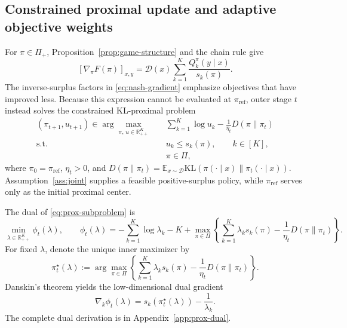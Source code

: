 \documentclass{article}
\theoremstyle{remark}
\theoremstyle{plain}
\newcommand{\KL}{\mathrm{KL}}
\newcommand{\E}{\mathbb{E}}
\newcommand{\R}{\mathbb{R}}
\newcommand{\D}{\mathcal{D}}
\newcommand{\piref}{\pi_{\mathrm{ref}}}
\begin{document}
\subsection{Constrained proximal update and adaptive objective weights}
For $\pi\in\Pi_+$, Proposition~\ref{prop:game-structure} and the chain rule give
\begin{equation}
\left[\nabla_\pi F(\pi)\right]_{x,y}
=
\D(x)\sum_{k=1}^K
\frac{Q_k^\pi(y\mid x)}{s_k(\pi)}.
\label{eq:nash-gradient}
\end{equation}
The inverse-surplus factors in \eqref{eq:nash-gradient} emphasize objectives that have improved less. Because this expression cannot be evaluated at $\piref$, outer stage $t$ instead solves the constrained KL-proximal problem
\begin{equation}
\begin{aligned}
(\pi_{t+1},u_{t+1})\in
\arg\max_{\pi,\,u\in\R_{++}^K}
\quad&
\sum_{k=1}^K\log u_k
-\frac{1}{\eta_t}D(\pi\|\pi_t)\\
\text{s.t.}\quad&
u_k\le s_k(\pi),\qquad k\in[K],\\
&\pi\in\Pi,
\end{aligned}
\label{eq:prox-subproblem}
\end{equation}
where $\pi_0=\piref$, $\eta_t>0$, and
$D(\pi\|\pi_t)=\E_{x\sim\D}\KL(\pi(\cdot\mid x)\|\pi_t(\cdot\mid x))$.
Assumption~\ref{ass:joint} supplies a feasible positive-surplus policy, while $\piref$ serves only as the initial proximal center.

The dual of \eqref{eq:prox-subproblem} is
\begin{equation}
\min_{\lambda\in\R_{++}^K}
\phi_t(\lambda),
\qquad
\phi_t(\lambda)
=
-\sum_{k=1}^K\log\lambda_k-K
+
\max_{\pi\in\Pi}
\left\{
\sum_{k=1}^K\lambda_k s_k(\pi)
-\frac{1}{\eta_t}D(\pi\|\pi_t)
\right\}.
\label{eq:prox-dual}
\end{equation}
For fixed $\lambda$, denote the unique inner maximizer by
\begin{equation}
\pi_t^\star(\lambda)
:=
\arg\max_{\pi\in\Pi}
\left\{
\sum_{k=1}^K\lambda_k s_k(\pi)
-\frac{1}{\eta_t}D(\pi\|\pi_t)
\right\}.
\label{eq:weighted-policy}
\end{equation}
Danskin's theorem yields the low-dimensional dual gradient
\begin{equation}
\nabla_k\phi_t(\lambda)
=
s_k\!\left(\pi_t^\star(\lambda)\right)-\frac{1}{\lambda_k}.
\label{eq:dual-gradient}
\end{equation}
The complete dual derivation is in Appendix~\ref{app:prox-dual}.
\end{document}

